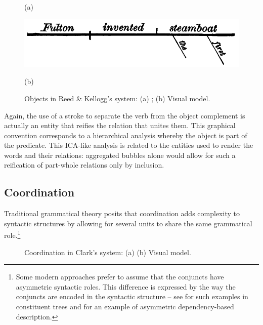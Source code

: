 \documentclass[output=paper]{langsci/langscibook}
\begin{document}
 \begin{figure}
     (a) \hspace{1em} \begin{minipage}[c]{.45\textwidth}\includegraphics[width=\textwidth]{figures/04/ReedKellog2.png}\end{minipage}\hfill
     (b) \hspace{1em} 
     \caption{Objects in Reed \& Kellogg’s system: (a) \citeyear[53]{reed_graded_1879}; (b) Visual model.\label{fig:4:6}}
 \end{figure}


Again, the use of a stroke to separate the verb from the object complement is actually an entity that reifies the relation that unites them. This graphical convention corresponds to a hierarchical analysis whereby the object is part of the predicate. This ICA-like analysis is related to the entities used to render the words and their relations: aggregated bubbles alone would allow for such a reification of part-whole relations only by inclusion.

\subsection{Coordination}\label{sec:4:4.2}

Traditional grammatical theory posits that coordination adds complexity to syntactic structures by allowing for several units to share the same grammatical role.\footnote{\textrm{Some modern approaches prefer to assume that the conjuncts have asymmetric syntactic roles. This difference is expressed by the way the conjuncts are encoded in the syntactic structure – see \citet{mouret_grammaire_2007} for such examples in constituent trees and \citet[50--51]{polguere_dependency_2009} for an example of asymmetric dependency-based description.}} 

\begin{figure}
    \caption{Coordination in Clark’s system: (a) \citet[24]{clark_science_1847} (b) Visual model.\label{fig:4:7}}    
\end{figure}
 
\end{document}
